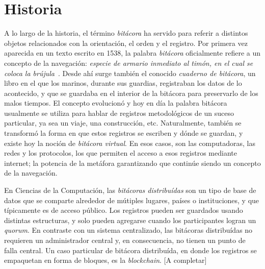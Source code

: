 \section{Historia}


A lo largo de la historia, el término \textit{bitácora} ha servido para referir a
distintos objetos relacionados con la orientación, el orden y el registro. Por
primera vez aparecida en un texto escrito en 1538,
la palabra \textit{bitácora}
oficialmente refiere a un concepto de la navegación: \textit{especie de armario
inmediato al timón, en el cual se coloca la brújula}~\cite{dic.Etimologico}.
Desde ahí surge también
el conocido \textit{cuaderno de bitácora}, un libro en el que los marinos, durante
sus guardias, registraban los datos de lo acontecido, y que se guardaba en el
interior de la bitácora para preservarlo de los malos tiempos. El concepto
evolucionó y hoy en día la palabra bitácora usualmente se utiliza para hablar
de registros metodológicos de un suceso particular, ya sea un viaje, una
construcción, etc. Naturalmente, también se transformó la forma en que estos
registros se escriben y dónde se guardan, y existe hoy la noción de \textit{bitácora
virtual}. En esos casos, son las computadoras, las redes y los protocolos,
los que permiten el acceso a esos registros mediante internet; la potencia de la
metáfora garantizando que continúe siendo un concepto de la navegación.
%

En Ciencias de la Computación, las \textit{bitácoras distribuídas} son un tipo de
base de datos que se comparte
alrededor de mútiples lugares, países o instituciones, y que típicamente es de
acceso público. Los registros pueden ser guardados usando distintas estructuras,
y solo pueden agregarse cuando los participantes logran un \textit{quorum}. En
contraste con un sistema centralizado, las bitácoras distribuídas no requieren
un administrador central y, en consecuencia, no tienen un punto de falla central.
Un caso particular de bitácora distribuída, en donde los registros se empaquetan
en forma de bloques, es la \textit{blockchain}. [A completar]

